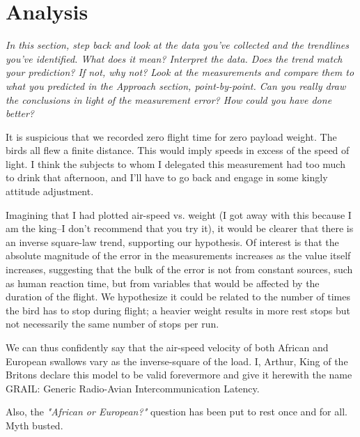 \section{Analysis}
\label{sec:analysis}

\emph{In this section, step back and look at the data you've collected and the trendlines you've identified.  What does it mean?  Interpret the data.  Does the trend match your prediction?  If not, why not?  Look at the measurements and compare them to what you predicted in the Approach section, point-by-point.  Can you really draw the conclusions in light of the measurement error?  How could you have done better?}

It is suspicious that we recorded zero flight time for zero payload weight.  The birds all flew a finite distance.  This would imply speeds in excess of the speed of light.  I think the subjects to whom I delegated this measurement had too much to drink that afternoon, and I'll have to go back and engage in some kingly attitude adjustment.

Imagining that I had plotted air-speed vs. weight (I got away with this because I am the king--I don't recommend that you try it), it would be clearer that there is an inverse square-law trend, supporting our hypothesis. Of interest is that the absolute magnitude of the error in the measurements increases as the value itself increases, suggesting that the bulk of the error is not from constant sources, such as human reaction time, but from variables that would be affected by the duration of the flight. We hypothesize it could be related to the number of times the bird has to stop during flight; a heavier weight results in more rest stops but not necessarily the same number of stops per run.

We can thus confidently say that the air-speed velocity of both African and European swallows vary as the inverse-square of the load.  I, Arthur, King of the Britons declare this model to be valid forevermore and give it herewith the name GRAIL: Generic Radio-Avian Intercommunication Latency.

Also, the \emph{"African or European?"} question has been put to rest once and for all.  Myth busted.
